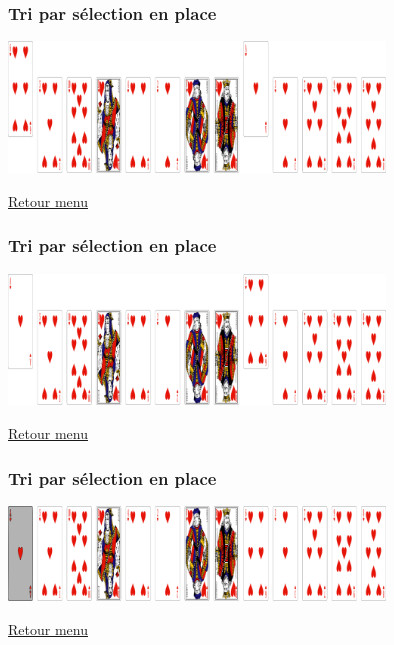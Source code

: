 \documentclass[svgnames,11pt]{beamer}
\begin{document}
\begin{frame}
    \frametitle{Tri par sélection en place}

    \begin{center}
        \centering
        \includegraphics[width=10cm]{ressources/selection-1-2.png}
        \label{pique}
    \end{center}
    \hyperlink{menu}{Retour menu}

\end{frame}

\begin{frame}
    \frametitle{Tri par sélection en place}

    \begin{center}
        \centering
        \includegraphics[width=10cm]{ressources/selection-1-3.png}
        \label{pique}
    \end{center}
    \hyperlink{menu}{Retour menu}

\end{frame}

\begin{frame}
    \frametitle{Tri par sélection en place}

    \begin{center}
        \centering
        \includegraphics[width=10cm]{ressources/selection-1-4.png}
        \label{pique}
    \end{center}
    \hyperlink{menu}{Retour menu}

\end{frame}
\end{document}
